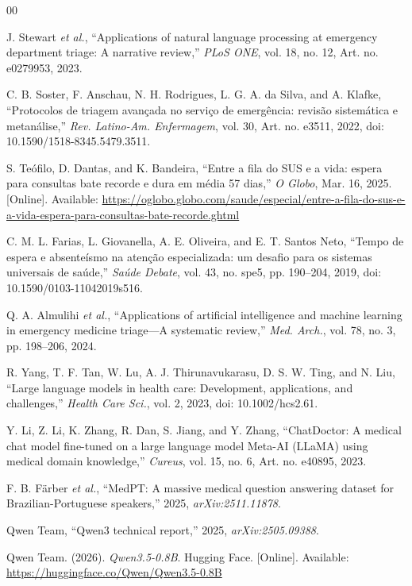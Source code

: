 \documentclass{ieeeaccess}
\begin{document}
\begin{thebibliography}{00}

 J. Stewart \emph{et al.}, ``Applications of natural language processing at emergency department triage: A narrative review,'' \emph{PLoS ONE}, vol. 18, no. 12, Art. no. e0279953, 2023.

 C. B. Soster, F. Anschau, N. H. Rodrigues, L. G. A. da Silva, and A. Klafke, ``Protocolos de triagem avan\c{c}ada no servi\c{c}o de emerg\^encia: revis\~ao sistem\'atica e metan\'alise,'' \emph{Rev. Latino-Am. Enfermagem}, vol. 30, Art. no. e3511, 2022, doi: 10.1590/1518-8345.5479.3511.

 S. Te\'ofilo, D. Dantas, and K. Bandeira, ``Entre a fila do SUS e a vida: espera para consultas bate recorde e dura em m\'edia 57 dias,'' \emph{O Globo}, Mar. 16, 2025. [Online]. Available: \url{https://oglobo.globo.com/saude/especial/entre-a-fila-do-sus-e-a-vida-espera-para-consultas-bate-recorde.ghtml}

 C. M. L. Farias, L. Giovanella, A. E. Oliveira, and E. T. Santos Neto, ``Tempo de espera e absente\'ismo na aten\c{c}\~ao especializada: um desafio para os sistemas universais de sa\'ude,'' \emph{Sa\'ude Debate}, vol. 43, no. spe5, pp. 190--204, 2019, doi: 10.1590/0103-11042019s516.

 Q. A. Almulihi \emph{et al.}, ``Applications of artificial intelligence and machine learning in emergency medicine triage---A systematic review,'' \emph{Med. Arch.}, vol. 78, no. 3, pp. 198--206, 2024.

 R. Yang, T. F. Tan, W. Lu, A. J. Thirunavukarasu, D. S. W. Ting, and N. Liu, ``Large language models in health care: Development, applications, and challenges,'' \emph{Health Care Sci.}, vol. 2, 2023, doi: 10.1002/hcs2.61.

 Y. Li, Z. Li, K. Zhang, R. Dan, S. Jiang, and Y. Zhang, ``ChatDoctor: A medical chat model fine-tuned on a large language model Meta-AI (LLaMA) using medical domain knowledge,'' \emph{Cureus}, vol. 15, no. 6, Art. no. e40895, 2023.

 F. B. F\"arber \emph{et al.}, ``MedPT: A massive medical question answering dataset for Brazilian-Portuguese speakers,'' 2025, \emph{arXiv:2511.11878}.

 Qwen Team, ``Qwen3 technical report,'' 2025, \emph{arXiv:2505.09388}.

 Qwen Team. (2026). \emph{Qwen3.5-0.8B}. Hugging Face. [Online]. Available: \url{https://huggingface.co/Qwen/Qwen3.5-0.8B}


\end{thebibliography}
\end{document}

